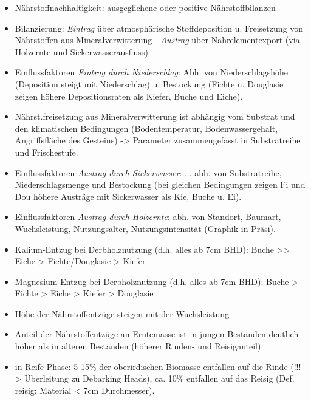\documentclass{article}
\begin{document}
\begin{itemize}
	
	\item Nährstoffnachhaltigkeit: ausgeglichene oder positive Nährstoffbilanzen
	
	\item Bilanzierung: \textit{Eintrag} über atmosphärische Stoffdeposition u. Freisetzung von Nährstoffen aus Mineralverwitterung - \textit{Austrag} über Nährelementexport (via Holzernte und Sickerwasserausfluss)
	
	\item Einflussfaktoren \textit{Eintrag durch Niederschlag}: Abh. von Niederschlagshöhe (Deposition steigt mit Niederschlag) u. Bestockung (Fichte u. Douglasie zeigen höhere Depositionsraten als Kiefer, Buche und Eiche). 
	
	\item Nährst.freisetzung aus Mineralverwitterung ist abhängig vom Substrat und den klimatischen Bedingungen (Bodentemperatur, Bodenwassergehalt, Angriffsfläche des Gesteins) -> Parameter zusammengefasst in Substratreihe und Frischestufe.
	
	\item Einflussfaktoren \textit{Austrag durch Sickerwasser}: ... abh. von Substratreihe, Niederschlagsmenge und Bestockung (bei gleichen Bedingungen zeigen Fi und Dou höhere Austräge mit Sickerwasser als Kie, Buche u. Ei). 
	
	\item Einflussfaktoren \textit{Austrag durch Holzernte}: abh. von Standort, Baumart, Wuchsleistung, Nutzungsalter, Nutzungsintensität (Graphik in Präsi). 
	
	\item Kalium-Entzug bei Derbholznutzung (d.h. alles ab 7cm BHD): Buche >> Eiche > Fichte/Douglasie > Kiefer
	
	\item Magnesium-Entzug bei Derbholznutzung (d.h. alles ab 7cm BHD): Buche > Fichte > Eiche > Kiefer > Douglasie
	
	\item Höhe der Nährstoffentzüge steigen mit der Wuchsleistung
	
	\item Anteil der Nährstoffentzüge an Erntemasse ist in jungen Beständen deutlich höher als in älteren Beständen (höherer Rinden- und Reisiganteil).
	
	\item in Reife-Phase: 5-15\% der oberirdischen Biomasse entfallen auf die Rinde (!!! -> Überleitung zu Debarking Heads), ca. 10\% entfallen auf das Reisig (Def. reisig: Material < 7cm Durchmesser).
	

\end{itemize}
\end{document}
